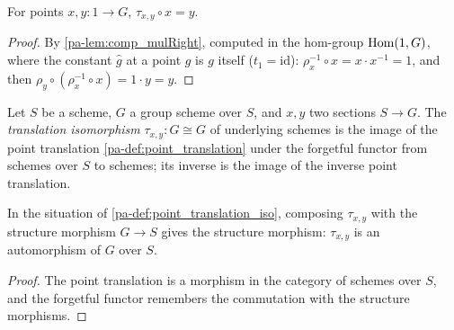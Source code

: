 \begin{lemma}
  \label{pa-lem:point_translation_apply}
  \leanok

  For points \(x, y : 1 \to G\),
  \(\tau_{x,y} \circ x = y\).
\end{lemma}
\begin{proof}
  \leanok
  By \ref{pa-lem:comp_mulRight}, computed in the hom-group \(\operatorname{Hom}(1, G)\), where
  the constant \(\hat g\) at a point \(g\) is \(g\) itself (\(t_1 =
  \mathrm{id}\)):
  \(\rho_x^{-1} \circ x = x \cdot x^{-1} = 1\), and then
  \(\rho_y \circ (\rho_x^{-1} \circ x) = 1 \cdot y = y\).
\end{proof}

\begin{definition}
  \label{pa-def:point_translation_iso}
  \leanok

  Let \(S\) be a scheme, \(G\) a group scheme over \(S\), and \(x, y\) two
  sections \(S \to G\). The \emph{translation isomorphism}
  \(\tau_{x,y} : G \cong G\) of underlying schemes is the image of the point
  translation \ref{pa-def:point_translation} under the forgetful functor from
  schemes over \(S\) to schemes; its inverse is the image of the inverse point
  translation.
\end{definition}

\begin{lemma}
  \label{pa-lem:point_translation_iso_over}
  \leanok

  In the situation of \ref{pa-def:point_translation_iso}, composing
  \(\tau_{x,y}\) with the structure morphism \(G \to S\) gives the structure
  morphism: \(\tau_{x,y}\) is an automorphism of \(G\) over \(S\).
\end{lemma}
\begin{proof}
  \leanok
  The point translation is a morphism in the category of schemes over \(S\),
  and the forgetful functor remembers the commutation with the structure
  morphisms.
\end{proof}

